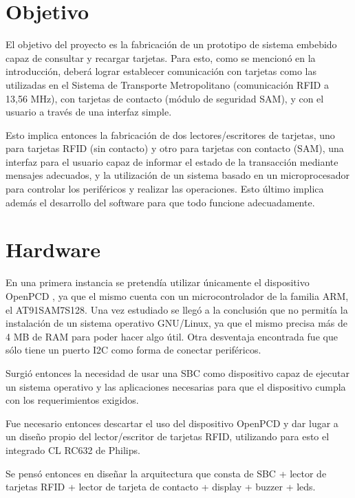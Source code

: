 \documentclass[%
        final,
        notitlepage,
        narroweqnarray,
        inline,
        ]{ieee}
\begin{document}
\section{Objetivo}
El objetivo del proyecto es la fabricación de un prototipo de sistema embebido capaz de consultar y recargar tarjetas. Para esto, como se mencionó en la introducción, deberá lograr establecer comunicación con tarjetas  como las utilizadas en el Sistema de Transporte Metropolitano (comunicación RFID a 13,56 MHz), con tarjetas de contacto (módulo de seguridad SAM), y con el usuario a través de una interfaz simple.


Esto implica entonces la fabricación de dos lectores/escritores de tarjetas, uno para tarjetas RFID (sin contacto) y
otro para tarjetas con contacto (SAM), una interfaz para el usuario capaz de informar el estado de la transacción
mediante mensajes adecuados, y la utilización de un sistema basado en un microprocesador para controlar los periféricos
y realizar las operaciones. Esto último implica además el desarrollo del software para que todo funcione adecuadamente.



\section{Hardware}
En una primera instancia se pretendía utilizar únicamente el dispositivo OpenPCD \cite{OpenPCD}, ya que el mismo cuenta con un microcontrolador de la familia ARM, el AT91SAM7S128. Una vez estudiado se llegó a la conclusión que no permitía la instalación de un sistema operativo GNU/Linux, ya que el mismo precisa más de 4 MB de RAM para poder hacer algo útil. Otra desventaja encontrada fue que sólo tiene un puerto I2C como forma de conectar periféricos.

Surgió entonces la necesidad de usar una SBC como dispositivo capaz de ejecutar un sistema operativo y las aplicaciones necesarias para que el dispositivo cumpla con los requerimientos exigidos.

Fue necesario entonces descartar el uso del dispositivo OpenPCD y dar lugar a un diseño propio del lector/escritor de tarjetas RFID, utilizando para esto el integrado CL RC632 de Philips.

Se pensó entonces en diseñar la arquitectura que consta de SBC + lector de tarjetas RFID + lector de tarjeta de contacto + display + buzzer + leds.
\end{document}
